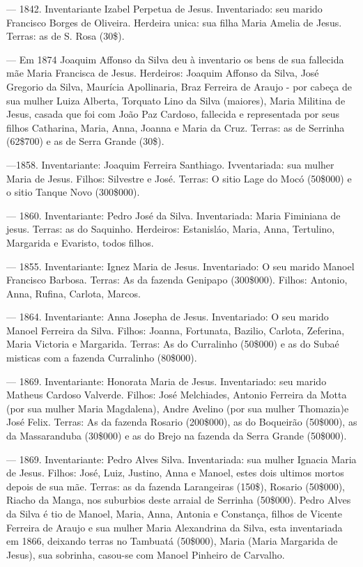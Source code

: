 — 1842. Inventariante Izabel Perpetua de Jesus. Inventariado: seu marido Francisco Borges de Oliveira. Herdeira unica: sua filha Maria Amelia de Jesus. Terras: as de S. Rosa (30\$).

— Em 1874 Joaquim Affonso da Silva deu à inventario os bens de sua fallecida mãe Maria Francisca de Jesus. Herdeiros: Joaquim Affonso da Silva, José Gregorio da Silva, Maurícia Apollinaria, Braz Ferreira de Araujo - por cabeça de sua mulher Luiza Alberta, Torquato Lino da Silva (maiores), Maria Militina de Jesus, casada que foi com João Paz Cardoso, fallecida e
representada por seus filhos Catharina, Maria, Anna, Joanna e Maria da Cruz. Terras: as de Serrinha (62\$700) e as de Serra Grande (30\$).

—1858. Inventariante: Joaquim Ferreira Santhiago. Ivventariada: sua mulher Maria de Jesus. Filhos: Silvestre e José. Terras: O sitio Lage do Mocó (50\$000) e o sitio Tanque Novo (300\$000).

— 1860. Inventariante:  Pedro  José da Silva. Inventariada: Maria Fiminiana de jesus. Terras: as do Saquinho. Herdeiros: Estanisláo, Maria, Anna, Tertulino, Margarida e Evaristo, todos filhos.

— 1855. Inventariante: Ignez Maria de Jesus. Inventariado: O seu marido Manoel Francisco Barbosa. Terras: As da fazenda Genipapo (300\$000). Filhos: Antonio, Anna, Rufina, Carlota, Marcos.

— 1864. Inventariante: Anna Josepha de Jesus. Inventariado: O seu marido Manoel Ferreira da Silva. Filhos: Joanna, Fortunata, Bazilio, Carlota, Zeferina, Maria Victoria e Margarida. Terras: As do Curralinho (50\$000) e as do Subaé misticas com a fazenda Curralinho (80\$000).

— 1869. Inventariante: Honorata Maria de Jesus. Inventariado: seu marido Matheus Cardoso Valverde. Filhos: José Melchiades, Antonio Ferreira da Motta (por sua mulher Maria  Magdalena), Andre  Avelino (por sua mulher Thomazia)e José Felix. Terras: As da fazenda Rosario (200\$000), as do Boqueirão (50\$000), as da Massaranduba (30\$000) e as do Brejo na fazenda da Serra Grande (50\$000).

— 1869. Inventariante: Pedro Alves Silva. Inventariada: sua mulher Ignacia Maria de Jesus. Filhos: José, Luiz, Justino, Anna e Manoel, estes dois ultimos mortos depois de sua mãe. Terras: as da fazenda Larangeiras (150\$), Rosario (50\$000), Riacho da Manga, nos suburbios deste arraial de Serrinha (50\$000). Pedro Alves da Silva é tio de Manoel, Maria, Anna, Antonia e Constança, filhos de Vicente Ferreira de Araujo e sua mulher Maria Alexandrina da Silva, esta inventariada em 1866, deixando terras no Tambuatá (50\$000), Maria (Maria Margarida de Jesus), sua sobrinha, casou-se com Manoel Pinheiro de Carvalho.

